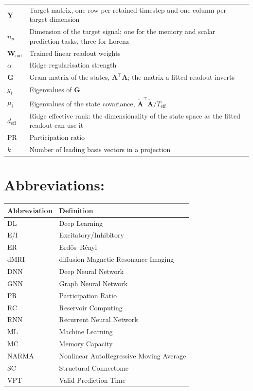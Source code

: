 \begin{longtable}{>{\raggedright\arraybackslash}p{3.4cm}p{\dimexpr\linewidth-3.4cm-4\tabcolsep\relax}}
    $\mathbf{Y}$ & Target matrix, one row per retained timestep and one column per target dimension \\
    $n_y$ & Dimension of the target signal; one for the memory and scalar prediction tasks, three for Lorenz \\
    $\mathbf{W}_{\!\mathrm{out}}$ & Trained linear readout weights \\
    $\alpha$ & Ridge regularisation strength \\
    $\mathbf{G}$ & Gram matrix of the states, $\mathbf{A}^{\top}\mathbf{A}$; the matrix a fitted readout inverts \\
    $g_i$ & Eigenvalues of $\mathbf{G}$ \\
    $\mu_i$ & Eigenvalues of the state covariance, $\tilde{\mathbf{A}}^{\top}\tilde{\mathbf{A}} / T_{\mathrm{eff}}$ \\
    $d_{\mathrm{eff}}$ & Ridge effective rank: the dimensionality of the state space as the fitted readout can use it \\
    $\mathrm{PR}$ & Participation ratio \\
    $k$ & Number of leading basis vectors in a projection \\

    \bottomrule
\end{longtable}




\section*{Abbreviations:}
\bigskip

\begin{longtable}{>{\raggedright\arraybackslash}p{3.4cm}p{\dimexpr\linewidth-3.4cm-4\tabcolsep\relax}}
    \toprule
    Abbreviation & Definition \\
    \midrule\endhead %

    DL & Deep Learning \\
    E/I & Excitatory/Inhibitory \\
    ER & Erdős–Rényi \\
    dMRI & diffusion Magnetic Resonance Imaging \\
    DNN & Deep Neural Network \\
    GNN & Graph Neural Network \\
    PR & Participation Ratio \\
    RC & Reservoir Computing \\
    RNN & Recurrent Neural Network \\
    ML & Machine Learning \\
    MC & Memory Capacity \\
    NARMA & Nonlinear AutoRegressive Moving Average \\
    SC & Structural Connectome \\
    VPT & Valid Prediction Time \\

    \bottomrule
\end{longtable}

